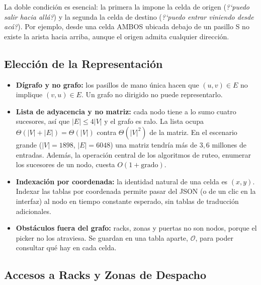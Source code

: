 \documentclass[11pt,a4paper]{article}
\theoremstyle{definition}
\newcommand{\sS}{\textsf{S}}
\newcommand{\sA}{\textsf{AMBOS}}
\begin{document}
La doble condición es esencial: la primera la impone la celda de origen (\emph{?`puedo salir hacia allá?}) y la segunda la celda de destino (\emph{?`puedo entrar viniendo desde acá?}). Por ejemplo, desde una celda \sA{} ubicada debajo de un pasillo \sS{} no existe la arista hacia arriba, aunque el origen admita cualquier dirección.

\subsection{Elección de la Representación}

\begin{itemize}[leftmargin=*]
\item \textbf{Dígrafo y no grafo:} los pasillos de mano única hacen que $(u,v)\in E$ no implique $(v,u)\in E$. Un grafo no dirigido no puede representarlo.
\item \textbf{Lista de adyacencia y no matriz:} cada nodo tiene a lo sumo cuatro sucesores, así que $|E|\le 4|V|$ y el grafo es ralo. La lista ocupa $\Theta(|V|+|E|)=\Theta(|V|)$ contra $\Theta(|V|^2)$ de la matriz. En el escenario grande ($|V|=1898$, $|E|=6048$) una matriz tendría más de $3{,}6$ millones de entradas. Además, la operación central de los algoritmos de ruteo, enumerar los sucesores de un nodo, cuesta $O(1+\text{grado})$.
\item \textbf{Indexación por coordenada:} la identidad natural de una celda es $(x,y)$. Indexar las tablas por coordenada permite pasar del JSON (o de un clic en la interfaz) al nodo en tiempo constante esperado, sin tablas de traducción adicionales.
\item \textbf{Obstáculos fuera del grafo:} racks, zonas y puertas no son nodos, porque el picker no los atraviesa. Se guardan en una tabla aparte, $\mathcal{O}$, para poder consultar qué hay en cada celda.
\end{itemize}

\subsection{Accesos a Racks y Zonas de Despacho}\label{sec:accesos}
\end{document}
